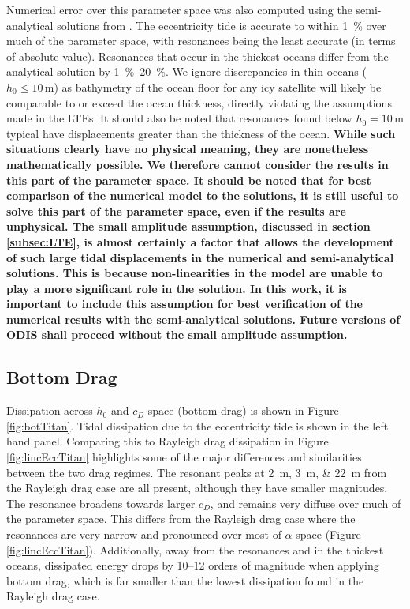 Numerical error over this parameter space was also computed using the semi-analytical solutions from \citet{matsuyama2014tidal}. The eccentricity tide is accurate to within \SI{1}{\percent} over much of the parameter space, with resonances being the least accurate (in terms of absolute value). Resonances that occur in the thickest oceans differ from the analytical solution by \SIrange{1}{20}{\percent}. We ignore discrepancies in thin oceans ($h_0 \leq 10 \, \si{\metre}$) as bathymetry of the ocean floor for any icy satellite will likely be comparable to or exceed the ocean thickness, directly violating the assumptions made in the LTEs. It should also be noted that resonances found below $h_0 = 10 \, \si{\metre}$ typical have displacements greater than the thickness of the ocean. \textbf{While such situations clearly have no physical meaning, they are nonetheless mathematically possible. We therefore cannot consider the results in this part of the parameter space. It should be noted that for best comparison of the numerical model to the \citet{matsuyama2014tidal} solutions, it is still useful to solve this part of the parameter space, even if the results are unphysical. The small amplitude assumption, discussed in section \ref{subsec:LTE}, is almost certainly a factor that allows the development of such large tidal displacements in the numerical and semi-analytical solutions. This is because non-linearities in the model are unable to play a more significant role in the solution. In this work, it is important to include this assumption for best verification of the numerical results with the semi-analytical solutions. Future versions of ODIS shall proceed without the small amplitude assumption.}

\subsection{Bottom Drag \label{subsec:botTitan}}

Dissipation across $h_0$ and $c_D$ space (bottom drag) is shown in Figure \ref{fig:botTitan}. Tidal dissipation due to the eccentricity tide is shown in the left hand panel. Comparing this to Rayleigh drag dissipation in Figure \ref{fig:lincEccTitan} highlights some of the major differences and similarities between the two drag regimes. The resonant peaks at \SIlist{2;3;22}{\metre} from the Rayleigh drag case are all present, although they have smaller magnitudes. The resonance broadens towards larger $c_D$, and remains very diffuse over much of the parameter space. This differs from the Rayleigh drag case where the resonances are very narrow and pronounced over most of $\alpha$ space (Figure \ref{fig:lincEccTitan}). Additionally, away from the resonances and in the thickest oceans, dissipated energy drops by \numrange{10}{12} orders of magnitude when applying bottom drag, which is far smaller than the lowest dissipation found in the Rayleigh drag case.  

